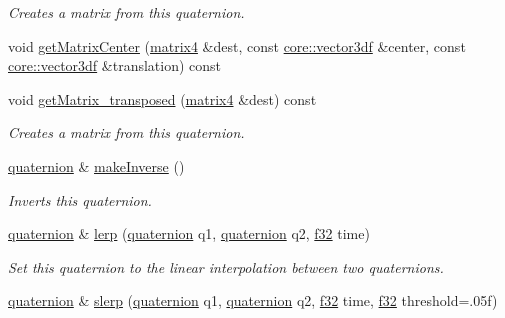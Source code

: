 \begin{DoxyCompactItemize}
\begin{DoxyCompactList}\small\item\em Creates a matrix from this quaternion. \end{DoxyCompactList}\item 
void \hyperlink{classirr_1_1core_1_1quaternion_ab0ed43e2e137b42128a80f71f03dac44}{get\+Matrix\+Center} (\hyperlink{namespaceirr_1_1core_a73fa92e638c5ca97efd72da307cc9b65}{matrix4} \&dest, const \hyperlink{namespaceirr_1_1core_a06f169d08b5c429f5575acb7edbad811}{core\+::vector3df} \&center, const \hyperlink{namespaceirr_1_1core_a06f169d08b5c429f5575acb7edbad811}{core\+::vector3df} \&translation) const
\item 
\mbox{\label{classirr_1_1core_1_1quaternion_abb660c84e6f51d7c5415c4eaf28a7bd2}} 
void \hyperlink{classirr_1_1core_1_1quaternion_abb660c84e6f51d7c5415c4eaf28a7bd2}{get\+Matrix\+\_\+transposed} (\hyperlink{namespaceirr_1_1core_a73fa92e638c5ca97efd72da307cc9b65}{matrix4} \&dest) const
\begin{DoxyCompactList}\small\item\em Creates a matrix from this quaternion. \end{DoxyCompactList}\item 
\mbox{\label{classirr_1_1core_1_1quaternion_a2e286be8b088fa3ade0ab74880ea4508}} 
\hyperlink{classirr_1_1core_1_1quaternion}{quaternion} \& \hyperlink{classirr_1_1core_1_1quaternion_a2e286be8b088fa3ade0ab74880ea4508}{make\+Inverse} ()
\begin{DoxyCompactList}\small\item\em Inverts this quaternion. \end{DoxyCompactList}\item 
\hyperlink{classirr_1_1core_1_1quaternion}{quaternion} \& \hyperlink{classirr_1_1core_1_1quaternion_a75b5cb2d26397f07399e79ea20f1aff1}{lerp} (\hyperlink{classirr_1_1core_1_1quaternion}{quaternion} q1, \hyperlink{classirr_1_1core_1_1quaternion}{quaternion} q2, \hyperlink{namespaceirr_a0277be98d67dc26ff93b1a6a1d086b07}{f32} time)
\begin{DoxyCompactList}\small\item\em Set this quaternion to the linear interpolation between two quaternions. \end{DoxyCompactList}\item 
\hyperlink{classirr_1_1core_1_1quaternion}{quaternion} \& \hyperlink{classirr_1_1core_1_1quaternion_a91335e9fdb50c3cfc2042aa9a4bfdf68}{slerp} (\hyperlink{classirr_1_1core_1_1quaternion}{quaternion} q1, \hyperlink{classirr_1_1core_1_1quaternion}{quaternion} q2, \hyperlink{namespaceirr_a0277be98d67dc26ff93b1a6a1d086b07}{f32} time, \hyperlink{namespaceirr_a0277be98d67dc26ff93b1a6a1d086b07}{f32} threshold=.\+05f)

\end{DoxyCompactItemize}
